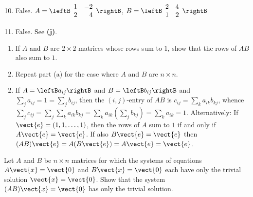 \begin{multicols}{2}
\begin{ex}
\begin{sol}
\begin{enumerate}[label={\alph*.}]
\setcounter{enumi}{9}
\item  False. $A = \leftB \begin{array}{rr}
1 & -2 \\
2 & 4
\end{array} \rightB$, $B = \leftB \begin{array}{rr}
2 & 4 \\
1 & 2
\end{array} \rightB$

\setcounter{enumi}{11}
\item  False. See \textbf{(j)}.

\end{enumerate}
\end{sol}
\end{ex}

\begin{ex}
\begin{enumerate}[label={\alph*.}]
\item If $A$ and $B$ are $2 \times 2$ matrices whose rows sum to $1$, show that the rows of $AB$ also sum to $1$.

\item Repeat part (a) for the case where $A$ and $B$ are $n \times n$.

\end{enumerate}
\begin{sol}
\begin{enumerate}[label={\alph*.}]
\setcounter{enumi}{1}
\item  If $A = \leftB a_{ij} \rightB$ and $B = \leftB b_{ij} \rightB$ and $\sum_{j}a_{ij} = 1 = \sum_{j}b_{ij}$, then the $(i, j)$-entry of $AB$ is $c_{ij} = \sum_{k}a_{ik}b_{kj}$, whence $\sum_{j}c_{ij} = \sum_{j}\sum_{k}a_{ik}b_{kj} = \sum_{k}a_{ik}(\sum_{j}b_{kj}) = \sum_{k}a_{ik} = 1$. Alternatively: If $\vect{e} = (1, 1, \dots, 1)$, then the rows of $A$ sum to $1$ if and only if $A\vect{e} = \vect{e}$. If also $B\vect{e} = \vect{e}$ then $(AB)\vect{e} = A(B\vect{e}) = A\vect{e} = \vect{e}$.

\end{enumerate}
\end{sol}
\end{ex}

\begin{ex}
Let $A$ and $B$ be $n \times n$ matrices for which the systems of equations $A\vect{x} = \vect{0}$ and $B\vect{x} = \vect{0}$ each have only the trivial solution $\vect{x} = \vect{0}$. Show that the system $(AB)\vect{x} = \vect{0}$ has only the trivial solution.
\end{ex}



\end{multicols}
